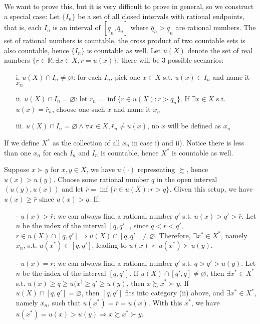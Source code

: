 \begin{enumerate}
    We want to prove this, but it is very difficult to prove in general, so we construct a special case: Let $\{I_n\}$ be a set of all closed intervals with rational endpoints, that is, each $I_n$ is an interval of $[\underline{q}_n,\bar{q}_n]$ where $\bar{q}_n>\underline{q}_n$ are rational numbers.
    The set of rational numbers is countable, the cross product of two countable sets is also countable, hence $\{I_n\}$ is countable as well. Let $u(X)$ denote the set of real numbers $\{r\in \mathbb{R}: \exists x\in X, r=u(x)\}$, there will be 3 possible scenarios:
    \begin{enumerate}
        \item[i.] $u(X)\cap I_n\neq \varnothing$: for each $I_n$, pick one $x\in X$ s.t. $u(x)\in I_n$ and name it $x_n$
        \item[ii.] $u(X)\cap I_n =\varnothing$: let $\bar{r}_n=\inf \{r\in u(X):r>\bar{q}_n\}$. If $\exists x\in X$ s.t. $u(x)=\bar{r}_n$, choose one such $x$ and name it $x_n$
        \item[iii.] $u(X)\cap I_n=\varnothing\land \forall x\in X, \bar{r}_n\neq u(x)$, no $x$ will be defined as $x_n$
    \end{enumerate}
    If we define $X^*$ as the collection of all $x_n$ in case i) and ii). Notice there is less than one $x_n$ for each $I_n$ and $I_n$ is countable, hence $X^*$ is countable as well.

    Suppose $x\succ y$ for $x,y\in X$, we have $u(\cdot)$ representing $\succsim$, hence $u(x)>u(y)$. Choose some rational number $q$ in the open interval $(u(y),u(x))$ and let $\bar{r}=\inf \{r\in u(X):r>q\}$. Given this setup, we have $u(x)\geq \bar{r}$ since $u(x)>q$. If:
    \begin{enumerate}
        \item[-] $u(x)>\bar{r}$: we can always find a rational number $q'$ s.t. $u(x)>q'>\bar{r}$. Let $n$ be the index of the interval $[q,q']$, since $q<\bar{r}<q'$, $\bar{r}\in u(X)\cap[q,q']\Rightarrow u(X)\cap[q,q']\neq \varnothing$. Therefore, $\exists x^*\in X^*$, namely $x_n$, s.t. $u(x^*)\in [q,q']$, leading to $u(x)\succ u(x^*)\succ u(y)$.
        \item[-] $u(x)=\bar{r}$: we can always find a rational number $q'$ s.t. $q>q'>u(y)$. Let $n$ be the index of the interval $[q,q']$. If $u(X)\cap [q',q]\neq \varnothing$, then $\exists x^*\in X^*$ s.t. $u(x)\geq q\geq u(x^)\geq q'\geq u(y)$, then $x\succsim x^*\succ y$. If $u(X)\cap [q,q']=\varnothing$, then $[q,q']$ fits into category (ii) above, and $\exists x^*\in X^*$, namely $x_n$, such that $u(x^*)=\bar{r}=u(x)$. With this $x^*$, we have $u(x^*)=u(x)>u(y)\Rightarrow x\succsim x^*\succ y$.
    \end{enumerate}
\end{enumerate}

